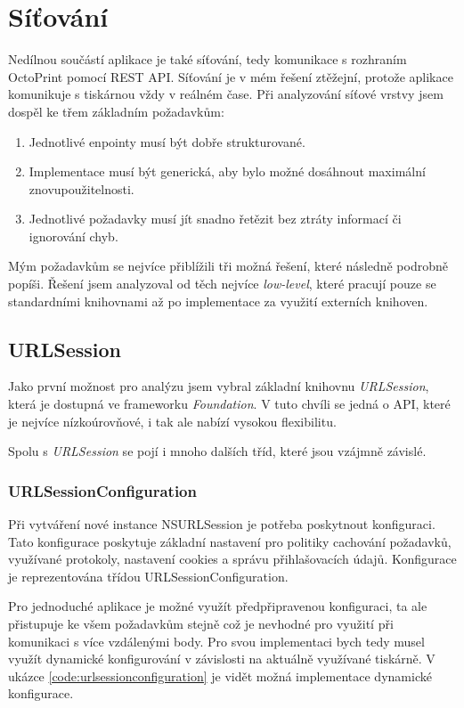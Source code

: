 \section{Síťování}\label{analyza-sitovani}

Nedílnou součástí aplikace je také síťování, tedy komunikace s rozhraním OctoPrint pomocí REST API.
Síťování je v mém řešení ztěžejní, protože aplikace komunikuje s tiskárnou vždy v reálném čase.
Při analyzování síťové vrstvy jsem dospěl ke třem základním požadavkům:

\begin{enumerate}
    \item Jednotlivé enpointy musí být dobře strukturované.
    \item Implementace musí být generická, aby bylo možné dosáhnout maximální znovupoužitelnosti.
    \item Jednotlivé požadavky musí jít snadno řetězit bez ztráty informací či ignorování chyb.
\end{enumerate}

Mým požadavkům se nejvíce přiblížili tři možná řešení, které následně podrobně popíši.
Řešení jsem analyzoval od těch nejvíce \textit{low-level}, které pracují pouze se standardními knihovnami až po implementace za využití externích knihoven.

\subsection{URLSession}

Jako první možnost pro analýzu jsem vybral základní knihovnu \textit{URLSession}, která je dostupná ve frameworku \textit{Foundation}.
V tuto chvíli se jedná o API, které je nejvíce nízkoúrovňové, i tak ale nabízí vysokou flexibilitu.

Spolu s \textit{URLSession} se pojí i mnoho dalších tříd, které jsou vzájmně závislé.

\subsubsection*{URLSessionConfiguration}

Při vytváření nové instance NSURLSession je potřeba poskytnout konfiguraci.
Tato konfigurace poskytuje základní nastavení pro politiky cachování požadavků, využívané protokoly, nastavení cookies a správu přihlašovacích údajů.
Konfigurace je reprezentována třídou URLSessionConfiguration.

Pro jednoduché aplikace je možné využít předpřipravenou konfiguraci, ta ale přistupuje ke všem požadavkům stejně což je nevhodné pro využití při komunikaci s více vzdálenými body.
Pro svou implementaci bych tedy musel využít dynamické konfigurování v závislosti na aktuálně využívané tiskárně.
V ukázce \ref{code:urlsessionconfiguration} je vidět možná implementace dynamické konfigurace.

